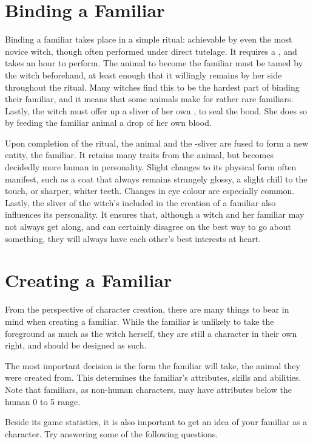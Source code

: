 \section{Binding a Familiar}

Binding a familiar takes place in a simple ritual: achievable by even the most novice witch, though often performed under direct tutelage.
It requires a , and takes an hour to perform.
The animal to become the familiar must be tamed by the witch beforehand, at least enough that it willingly remains by her side throughout the ritual.
Many witches find this to be the hardest part of binding their familiar, and it means that some animals make for rather rare familiars.
Lastly, the witch must offer up a sliver of her own {\soul}, to seal the bond.
She does so by feeding the familiar animal a drop of her own blood.

Upon completion of the ritual, the animal and the {\soul}-sliver are fused to form a new entity, the familiar.
It retains many traits from the animal, but becomes decidedly more human in personality.
Slight changes to its physical form often manifest, such as a coat that always remains strangely glossy, a slight chill to the touch, or sharper, whiter teeth.
Changes in eye colour are especially common.
Lastly, the sliver of the witch's {\soul} included in the creation of a familiar also influences its personality.
It ensures that, although a witch and her familiar may not always get along, and can certainly disagree on the best way to go about something, they will always have each other's best interests at heart.

\section{Creating a Familiar}

From the perspective of character creation, there are many things to bear in mind when creating a familiar.
While the familiar is unlikely to take the foreground as much as the witch herself, they are still a character in their own right, and should be designed as such.

The most important decision is the form the familiar will take, the animal they were created from.
This determines the familiar's attributes, skills and abilities.
Note that familiars, as non-human characters, may have attributes below the human 0 to 5 range.

Beside its game statistics, it is also important to get an idea of your familiar as a character.
Try answering some of the following questions.

